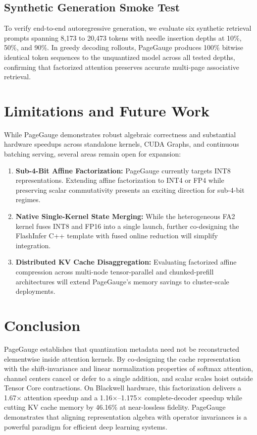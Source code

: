 \documentclass{article}
\begin{document}
\subsection{Synthetic Generation Smoke Test}
To verify end-to-end autoregressive generation, we evaluate six synthetic retrieval prompts spanning 8,173 to 20,473 tokens with needle insertion depths at 10\%, 50\%, and 90\%. In greedy decoding rollouts, PageGauge produces 100\% bitwise identical token sequences to the unquantized model across all tested depths, confirming that factorized attention preserves accurate multi-page associative retrieval.

\section{Limitations and Future Work}
While PageGauge demonstrates robust algebraic correctness and substantial hardware speedups across standalone kernels, CUDA Graphs, and continuous batching serving, several areas remain open for expansion:
\begin{enumerate}
    \item \textbf{Sub-4-Bit Affine Factorization:} PageGauge currently targets INT8 representations. Extending affine factorization to INT4 or FP4 while preserving scalar commutativity presents an exciting direction for sub-4-bit regimes.
    \item \textbf{Native Single-Kernel State Merging:} While the heterogeneous FA2 kernel fuses INT8 and FP16 into a single launch, further co-designing the FlashInfer C++ template with fused online reduction will simplify integration.
    \item \textbf{Distributed KV Cache Disaggregation:} Evaluating factorized affine compression across multi-node tensor-parallel and chunked-prefill architectures will extend PageGauge's memory savings to cluster-scale deployments.
\end{enumerate}

\section{Conclusion}
PageGauge establishes that quantization metadata need not be reconstructed elementwise inside attention kernels. By co-designing the cache representation with the shift-invariance and linear normalization properties of softmax attention, channel centers cancel or defer to a single addition, and scalar scales hoist outside Tensor Core contractions. On Blackwell hardware, this factorization delivers a 1.67$\times$ attention speedup and a 1.16$\times$--1.175$\times$ complete-decoder speedup while cutting KV cache memory by 46.16\% at near-lossless fidelity. PageGauge demonstrates that aligning representation algebra with operator invariances is a powerful paradigm for efficient deep learning systems.
\end{document}
